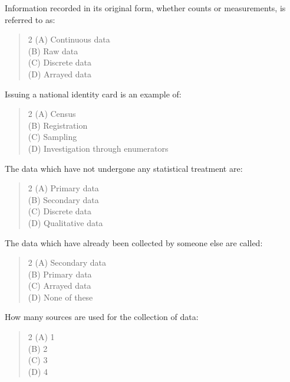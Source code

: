 \documentclass[11pt,a4paper]{article}
\begin{document}
\begin{mcqlist}
\item Information recorded in its original form, whether counts or measurements, is referred to as:
\begin{quote}\begin{multicols}{2}
\noindent (A) Continuous data \\
(B) Raw data \\
(C) Discrete data \\
(D) Arrayed data
\end{multicols}\end{quote}

\item Issuing a national identity card is an example of:
\begin{quote}\begin{multicols}{2}
\noindent (A) Census \\
(B) Registration \\
(C) Sampling \\
(D) Investigation through enumerators
\end{multicols}\end{quote}

\item The data which have not undergone any statistical treatment are:
\begin{quote}\begin{multicols}{2}
\noindent (A) Primary data \\
(B) Secondary data \\
(C) Discrete data \\
(D) Qualitative data
\end{multicols}\end{quote}

\item The data which have already been collected by someone else are called:
\begin{quote}\begin{multicols}{2}
\noindent (A) Secondary data \\
(B) Primary data \\
(C) Arrayed data \\
(D) None of these
\end{multicols}\end{quote}

\item How many sources are used for the collection of data:
\begin{quote}\begin{multicols}{2}
\noindent (A) 1 \\
(B) 2 \\
(C) 3 \\
(D) 4
\end{multicols}\end{quote}


\end{mcqlist}
\end{document}

